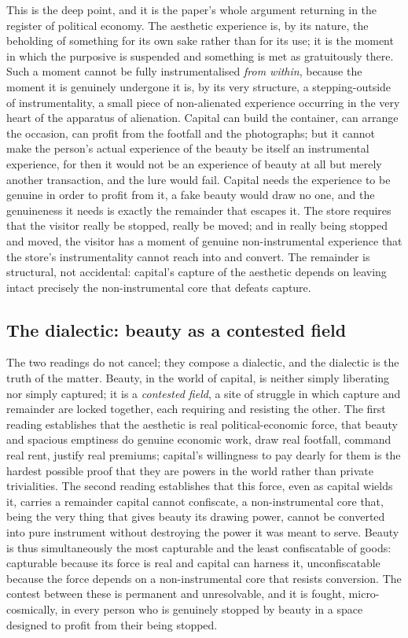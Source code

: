 This is the deep point, and it is the paper's whole argument returning in the register of political economy. The aesthetic experience is, by its nature, the beholding of something for its own sake rather than for its use; it is the moment in which the purposive is suspended and something is met as gratuitously there. Such a moment cannot be fully instrumentalised \emph{from within}, because the moment it is genuinely undergone it is, by its very structure, a stepping-outside of instrumentality, a small piece of non-alienated experience occurring in the very heart of the apparatus of alienation. Capital can build the container, can arrange the occasion, can profit from the footfall and the photographs; but it cannot make the person's actual experience of the beauty be itself an instrumental experience, for then it would not be an experience of beauty at all but merely another transaction, and the lure would fail. Capital needs the experience to be genuine in order to profit from it, a fake beauty would draw no one, and the genuineness it needs is exactly the remainder that escapes it. The store requires that the visitor really be stopped, really be moved; and in really being stopped and moved, the visitor has a moment of genuine non-instrumental experience that the store's instrumentality cannot reach into and convert. The remainder is structural, not accidental: capital's capture of the aesthetic depends on leaving intact precisely the non-instrumental core that defeats capture.

\subsection{The dialectic: beauty as a contested field}
\label{p21:sub:pe-dialectic}

The two readings do not cancel; they compose a dialectic, and the dialectic is the truth of the matter. Beauty, in the world of capital, is neither simply liberating nor simply captured; it is a \emph{contested field}, a site of struggle in which capture and remainder are locked together, each requiring and resisting the other. The first reading establishes that the aesthetic is real political-economic force, that beauty and spacious emptiness do genuine economic work, draw real footfall, command real rent, justify real premiums; capital's willingness to pay dearly for them is the hardest possible proof that they are powers in the world rather than private trivialities. The second reading establishes that this force, even as capital wields it, carries a remainder capital cannot confiscate, a non-instrumental core that, being the very thing that gives beauty its drawing power, cannot be converted into pure instrument without destroying the power it was meant to serve. Beauty is thus simultaneously the most capturable and the least confiscatable of goods: capturable because its force is real and capital can harness it, unconfiscatable because the force depends on a non-instrumental core that resists conversion. The contest between these is permanent and unresolvable, and it is fought, micro-cosmically, in every person who is genuinely stopped by beauty in a space designed to profit from their being stopped.

